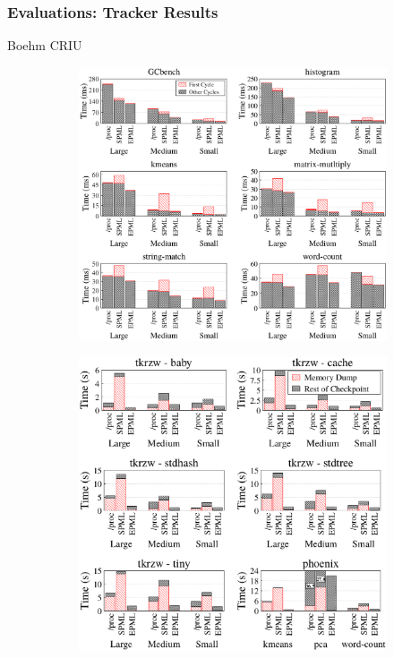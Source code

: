 \documentclass[xcolor=table,bigger,unknownkeysallowed]{beamer}
\begin{document}
\begin{frame}
	\frametitle{Evaluations: Tracker Results}
	Boehm \hspace*{3cm} CRIU
	\begin{figure}[!h]
		\centering 
		\begin{subfigure}[m]{.32\linewidth}
			\centering
			\includegraphics[width=\linewidth]{fig/boehm-results-tracker}			
		\end{subfigure}	
		\hfill
		\begin{subfigure}[m]{.32\linewidth}
			\centering
			\includegraphics[width=\linewidth]{fig/criu-results-tracker}			

\end{subfigure}
\end{figure}
\end{frame}
\end{document}
